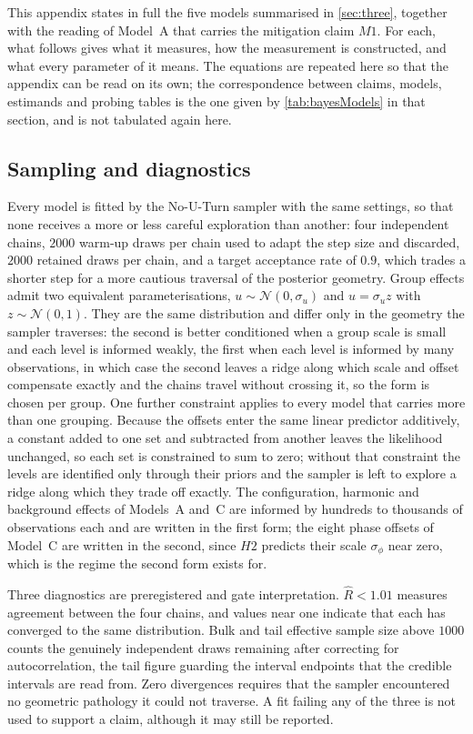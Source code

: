 This appendix states in full the five models summarised in \autoref{sec:three}, together with the reading of Model~A that carries the mitigation claim $M1$. For each, what follows gives what it measures, how the measurement is constructed, and what every parameter of it means. The equations are repeated here so that the appendix can be read on its own; the correspondence between claims, models, estimands and probing tables is the one given by \autoref{tab:bayesModels} in that section, and is not tabulated again here.

\subsection{Sampling and diagnostics}

Every model is fitted by the No-U-Turn sampler with the same settings, so that none receives a more or less careful exploration than another: four independent chains, $2000$ warm-up draws per chain used to adapt the step size and discarded, $2000$ retained draws per chain, and a target acceptance rate of $0.9$, which trades a shorter step for a more cautious traversal of the posterior geometry. Group effects admit two equivalent parameterisations, $u\sim\mathcal N(0,\sigma_u)$ and $u=\sigma_u z$ with $z\sim\mathcal N(0,1)$. They are the same distribution and differ only in the geometry the sampler traverses: the second is better conditioned when a group scale is small and each level is informed weakly, the first when each level is informed by many observations, in which case the second leaves a ridge along which scale and offset compensate exactly and the chains travel without crossing it, so the form is chosen per group. One further constraint applies to every model that carries more than one grouping. Because the offsets enter the same linear predictor additively, a constant added to one set and subtracted from another leaves the likelihood unchanged, so each set is constrained to sum to zero; without that constraint the levels are identified only through their priors and the sampler is left to explore a ridge along which they trade off exactly. The configuration, harmonic and background effects of Models~A and~C are informed by hundreds to thousands of observations each and are written in the first form; the eight phase offsets of Model~C are written in the second, since $H2$ predicts their scale $\sigma_\phi$ near zero, which is the regime the second form exists for.

Three diagnostics are preregistered and gate interpretation. $\hat R<1.01$ measures agreement between the four chains, and values near one indicate that each has converged to the same distribution. Bulk and tail effective sample size above $1000$ counts the genuinely independent draws remaining after correcting for autocorrelation, the tail figure guarding the interval endpoints that the credible intervals are read from. Zero divergences requires that the sampler encountered no geometric pathology it could not traverse. A fit failing any of the three is not used to support a claim, although it may still be reported.

